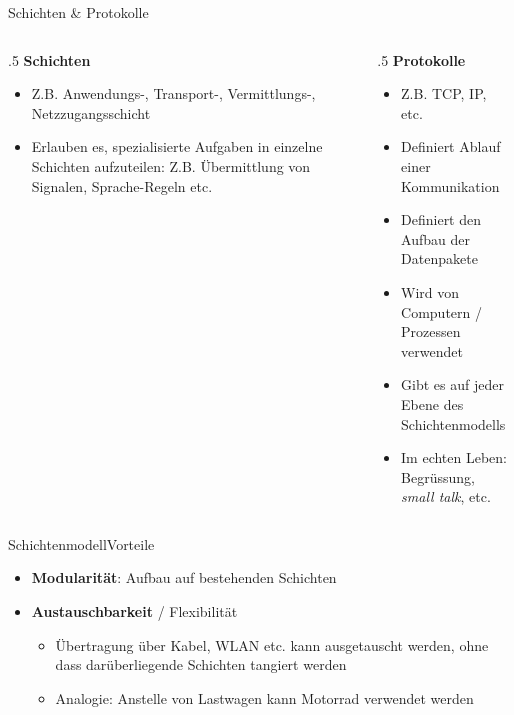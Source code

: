 \begin{frame}[fragile]{Schichten \& Protokolle}
\begin{columns}[t]
\begin{column}{.5\textwidth}
\textbf{Schichten}
\begin{itemize}[<+->]
\item Z.B. Anwendungs-, Transport-, Vermittlungs-, Netzzugangsschicht
\item Erlauben es, spezialisierte Aufgaben in einzelne Schichten aufzuteilen: Z.B. Übermittlung von Signalen, Sprache-Regeln etc.
\end{itemize}
\end{column}

\begin{column}{.5\textwidth}
\textbf{Protokolle}
\begin{itemize}[<+->]
\item Z.B. TCP, IP, etc.
\item Definiert Ablauf einer Kommunikation
\item Definiert den Aufbau der Datenpakete
\item Wird von Computern / Prozessen verwendet
\item Gibt es auf jeder Ebene des Schichtenmodells
\item Im echten Leben: Begrüssung, \textit{small talk}, etc.
\end{itemize}
\end{column}
\end{columns}
\end{frame}

\begin{frame}[fragile]{Schichtenmodell}{Vorteile}
\begin{itemize}[<+->]
\item \textbf{Modularität}: Aufbau auf bestehenden Schichten
\item \textbf{Austauschbarkeit} / Flexibilität
\begin{itemize}
\item Übertragung über Kabel, WLAN etc. kann ausgetauscht werden, ohne dass darüberliegende Schichten tangiert werden
\item Analogie: Anstelle von Lastwagen kann Motorrad verwendet werden
\end{itemize}
\end{itemize}

\end{frame}



